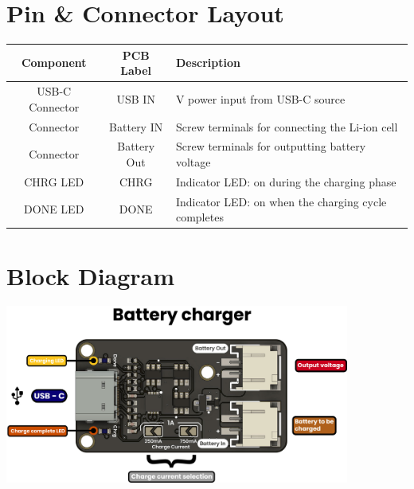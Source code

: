 \documentclass[10pt]{article}
\begin{document}
\section*{Pin \& Connector Layout}
\begin{tabularx}{\textwidth}{|c|c|>{\RaggedRight\arraybackslash}X|}
\hline
\rowcolor{headergray}
Component & PCB Label & Description \\
\hline
USB-C Connector & USB IN & 5 V power input from USB-C source \\
Connector & Battery IN & Screw terminals for connecting the Li-ion cell \\
Connector & Battery Out & Screw terminals for outputting battery voltage \\
CHRG LED & CHRG & Indicator LED: on during the charging phase \\
DONE LED & DONE & Indicator LED: on when the charging cycle completes \\
\hline
\end{tabularx}


\FloatBarrier
\newpage
\vspace*{3em}
\section*{Block Diagram}
\vspace{1em}
\begin{center}
\includegraphics[width=0.85\textwidth,keepaspectratio]{images/function-diagram.jpg}
\end{center}
\newpage
\vspace*{3em}
\end{document}
